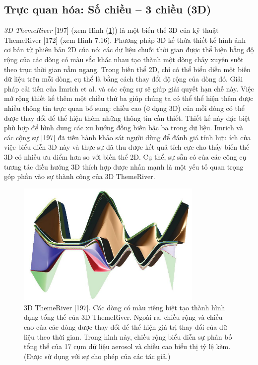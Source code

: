 \subsection{Trực quan hóa: Số chiều – 3 chiều (3D)}
\textit{3D ThemeRiver} [197] (xem Hình (\ref{fig:f7.15})) là một biến thể 3D của kỹ thuật ThemeRiver [172] (xem Hình 7.16). Phương pháp 3D kế thừa thiết kế hình ảnh cơ bản từ phiên bản 2D của nó: các dữ liệu chuỗi thời gian được thể hiện bằng độ rộng của các dòng có màu sắc khác nhau tạo thành một dòng chảy xuyên suốt theo trục thời gian nằm ngang. Trong biến thể 2D, chỉ có thể biểu diễn một biến dữ liệu trên mỗi dòng, cụ thể là bằng cách thay đổi độ rộng của dòng đó. Giải pháp cải tiến của Imrich et al. và các cộng sự sẽ giúp giải quyết hạn chế này. Việc mở rộng thiết kế thêm một chiều thứ ba giúp chúng ta có thể thể hiện thêm được nhiều thông tin trực quan bổ sung: chiều cao (ở dạng 3D) của mỗi dòng có thể được thay đổi để thể hiện thêm những thông tin cần thiết. Thiết kế này đặc biệt phù hợp để hình dung các xu hướng đồng biến bậc ba trong dữ liệu. Imrich và các cộng sự [197] đã tiến hành khảo sát người dùng để đánh giá tính hữu ích của việc biểu diễn 3D này và thực sự đã thu được kết quả tích cực cho thấy biến thể 3D có nhiều ưu điểm hơn so với biến thể 2D. Cụ thể, sự sẵn có của các công cụ tương tác điều hướng 3D thích hợp được nhấn mạnh là một yếu tố quan trọng góp phần vào sự thành công của 3D ThemeRiver.
\begin{figure}[H] %
    \centering %
    \includegraphics[width=0.8\textwidth]{assets/fig_7_15.png} 
    \caption{3D ThemeRiver [197]. Các dòng có màu riêng biệt tạo thành hình dạng tổng thể của 3D ThemeRiver. Ngoài ra, chiều rộng và chiều cao của các dòng được thay đổi để thể hiện giá trị thay đổi của dữ liệu theo thời gian. Trong hình này, chiều rộng biểu diễn sự phân bố tổng thể của 17 cụm dữ liệu aerosol và chiều cao biểu thị tỷ lệ kẽm. (Được sử dụng với sự cho phép của các tác giả.)} %
    \label{fig:f7.15}
\end{figure}
